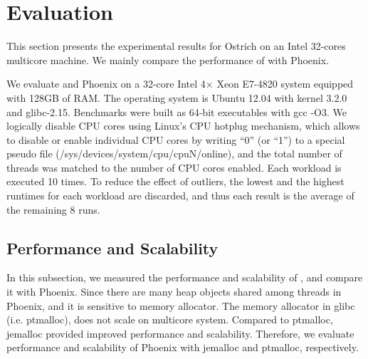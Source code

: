 \section{Evaluation}
This section presents the experimental results for Ostrich on an Intel 32-cores multicore machine. 
We mainly compare the performance of \myds with Phoenix.

We evaluate \myds and Phoenix on a 32-core Intel 4× Xeon E7-4820 system equipped with 128GB of RAM. 
The operating system is Ubuntu 12.04 with kernel 3.2.0 and glibc-2.15.
Benchmarks were built as 64-bit executables with gcc -O3.
We logically disable CPU cores using Linux’s CPU hotplug mechanism, which allows to disable or enable individual CPU cores by writing “0” (or “1”) to a special pseudo file (/sys/devices/system/cpu/cpuN/online), and the total number of threads was matched to the number of CPU cores enabled.
Each workload is executed 10 times. 
To reduce the effect of outliers, the lowest and the highest runtimes for each workload are discarded, and thus each result is the average of the remaining 8 runs.

\subsection{Performance and Scalability}
In this subsection, we measured the performance and scalability of \myds, and compare it with Phoenix.  
Since there are many heap objects shared among threads in Phoenix, and it is sensitive to memory allocator.
The memory allocator in glibc (i.e. ptmalloc\cite{gloger1997ptmalloc}), does not scale on multicore system. 
Compared to ptmalloc\cite{gloger1997ptmalloc}, jemalloc provided improved performance and scalability\cite{evans2006jemalloc}. 
Therefore, we evaluate performance and scalability of Phoenix with jemalloc and ptmalloc, respectively.


